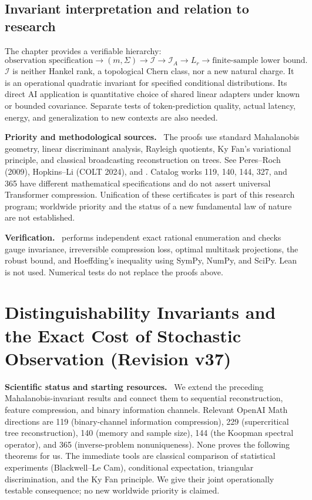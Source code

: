 \documentclass[11pt,a4paper,oneside]{book}
\newcommand{\note}[1]{\par\medskip\noindent\textbf{#1}\ }
\begin{document}
\section{Invariant interpretation and relation to research}
The chapter provides a verifiable hierarchy:
\[\text{observation specification}\longrightarrow(m,\Sigma)\longrightarrow\mathcal I\longrightarrow\mathcal I_A\longrightarrow L_r\longrightarrow\text{finite-sample lower bound}.\]
$\mathcal I$ is neither Hankel rank, a topological Chern class, nor a new natural charge. It is an operational quadratic invariant for specified conditional distributions. Its direct AI application is quantitative choice of shared linear adapters under known or bounded covariance. Separate tests of token-prediction quality, actual latency, energy, and generalization to new contexts are also needed.
\note{Priority and methodological sources.} The proofs use standard Mahalanobis geometry, linear discriminant analysis, Rayleigh quotients, Ky Fan's variational principle, and classical broadcasting reconstruction on trees. See Peres--Roch (2009), Hopkins--Li (COLT 2024), and . Catalog works 119, 140, 144, 327, and 365 have different mathematical specifications and do not assert universal Transformer compression. Unification of these certificates is part of this research program; worldwide priority and the status of a new fundamental law of nature are not established.
\note{Verification.}  performs independent exact rational enumeration and checks gauge invariance, irreversible compression loss, optimal multitask projections, the robust bound, and Hoeffding's inequality using SymPy, NumPy, and SciPy. Lean is not used. Numerical tests do not replace the proofs above.

\chapter{Distinguishability Invariants and the Exact Cost of Stochastic Observation (Revision v37)}
\note{Scientific status and starting resources.} We extend the preceding Mahalanobis-invariant results and connect them to sequential reconstruction, feature compression, and binary information channels. Relevant OpenAI Math directions are 119 (binary-channel information compression), 229 (supercritical tree reconstruction), 140 (memory and sample size), 144 (the Koopman spectral operator), and 365 (inverse-problem nonuniqueness). None proves the following theorems for us. The immediate tools are classical comparison of statistical experiments (Blackwell--Le Cam), conditional expectation, triangular discrimination, and the Ky Fan principle. We give their joint operationally testable consequence; no new worldwide priority is claimed.
\end{document}
